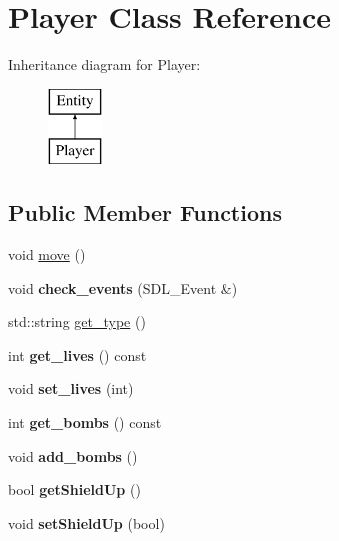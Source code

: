 \hypertarget{class_player}{\section{\-Player \-Class \-Reference}
\label{class_player}
}
\-Inheritance diagram for \-Player\-:\begin{figure}[H]
\begin{center}
\leavevmode
\includegraphics[height=2.000000cm]{class_player}
\end{center}
\end{figure}
\subsection*{\-Public \-Member \-Functions}
\begin{DoxyCompactItemize}
\item 
void \hyperlink{class_player_ae02ee46d8c20dd0697b975f935b09839}{move} ()
\item 
\hypertarget{class_player_a28e6e1953c46ff63b73e9e9edc40ef85}{void {\bfseries check\-\_\-events} (\-S\-D\-L\-\_\-\-Event \&)}\label{class_player_a28e6e1953c46ff63b73e9e9edc40ef85}

\item 
std\-::string \hyperlink{class_player_a8b3807ccac35ff048ae61d067e26651c}{get\-\_\-type} ()
\item 
\hypertarget{class_player_a4239892254b0da91ad3ff09cb49e4906}{int {\bfseries get\-\_\-lives} () const }\label{class_player_a4239892254b0da91ad3ff09cb49e4906}

\item 
\hypertarget{class_player_a55f1739a8bdd202cc621f379bf1185b6}{void {\bfseries set\-\_\-lives} (int)}\label{class_player_a55f1739a8bdd202cc621f379bf1185b6}

\item 
\hypertarget{class_player_abf2023675953b299b3da5cd36c567ed0}{int {\bfseries get\-\_\-bombs} () const }\label{class_player_abf2023675953b299b3da5cd36c567ed0}

\item 
\hypertarget{class_player_a1f073f400f3de1fb8c0666a4f8c804ab}{void {\bfseries add\-\_\-bombs} ()}\label{class_player_a1f073f400f3de1fb8c0666a4f8c804ab}

\item 
\hypertarget{class_player_a45dee11394bc17b01e641a7e7e4f1785}{bool {\bfseries get\-Shield\-Up} ()}\label{class_player_a45dee11394bc17b01e641a7e7e4f1785}

\item 
\hypertarget{class_player_a20bae59e1d4047759b7299f2e224083e}{void {\bfseries set\-Shield\-Up} (bool)}\label{class_player_a20bae59e1d4047759b7299f2e224083e}

\end{DoxyCompactItemize}


